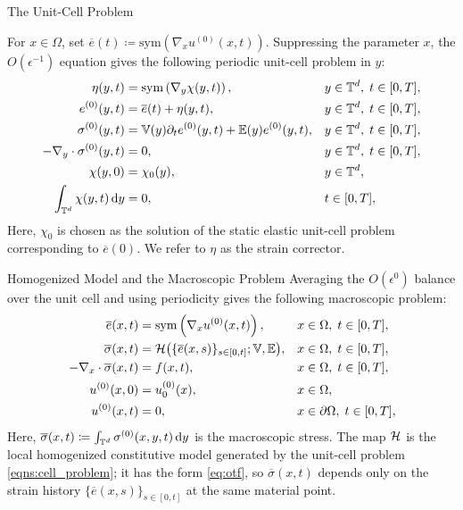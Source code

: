 \documentclass[3p, 12pt, preprint]{elsarticle}
\begin{document}
\begin{namedparagraph}{The Unit-Cell Problem}

For $x\in\Omega$, set $\overline{e}(t)\coloneqq\mathrm{sym}(\nabla_x u^{(0)}(x, t))$. Suppressing the parameter $x$, the $O(\epsilon^{-1})$ equation gives the following periodic unit-cell problem in $y$:
\begin{subequations}\label{eqns:cell_problem}
\begin{align}
    \eta(y,t) & = \mathrm{sym}\left(\nabla_y \chi (y,t)\right), && y \in \mathbb{T}^d,\; t \in [0,T], \label{eq:strain_corrector}\\
    e^{(0)}(y,t) &= \overline{e}(t) + \eta(y,t), && y \in \mathbb{T}^d,\; t \in [0,T], \\
    \sigma^{(0)}(y,t) & = \mathbb{V}(y) \partial_t e^{(0)}(y,t) + \mathbb{E}(y) e^{(0)}(y,t), && y \in \mathbb{T}^d,\; t \in [0,T], \label{eq:cell_stress}\\
    - \nabla_y \cdot \sigma^{(0)}(y,t) &= 0, && y \in \mathbb{T}^d,\; t \in [0,T], \\
    \chi(y,0) & = \chi_{0}(y), && y\in\mathbb{T}^d, \\
    \int_{\mathbb{T}^d} \chi(y,t)\,\mathrm{d} y &= 0, && t\in [0,T],
\end{align}
\end{subequations}
Here, $\chi_0$ is chosen as the solution of the static elastic unit-cell problem corresponding to $\overline{e}(0)$. We refer to $\eta$ as the strain corrector.
\end{namedparagraph}

\begin{namedparagraph}{Homogenized Model and the Macroscopic Problem}
Averaging the $O(\epsilon^{0})$ balance over the unit cell and using periodicity gives the following macroscopic problem:
\begin{subequations}\label{eqns:homogenized_problem}
\begin{align}
    \overline{e}(x,t) &= \mathrm{sym}\left(\nabla_x u^{(0)}(x,t)\right), && x \in \Omega,\; t \in [0,T], \\
    \overline{\sigma}(x,t) &= {\mathcal{H}}\big(\{\overline{e}(x,s)\}_{s\in[0,t]};\mathbb{V},\mathbb{E}\big), && x \in \Omega,\; t \in [0,T], \\
    -\nabla_x \cdot \overline{\sigma}(x,t) &= f(x,t), && x \in \Omega,\; t \in [0,T], \\
    u^{(0)}(x,0) &= u_0^{(0)}(x), && x\in\Omega, \\
    u^{(0)}(x,t) &= 0, && x\in\partial\Omega,\; t\in [0,T],
\end{align}
\end{subequations}
Here, $\overline{\sigma}(x,t) \coloneqq \int_{\mathbb{T}^d} \sigma^{(0)}(x,y,t)\,\mathrm{d}y$ is the macroscopic stress. The map ${\mathcal{H}}$ is the local homogenized constitutive model generated by the unit-cell problem \cref{eqns:cell_problem}; it has the form \eqref{eq:otf}, so $\overline\sigma(x,t)$ depends only on the strain history $\{\overline e(x,s)\}_{s\in[0,t]}$ at the same material point.
\end{namedparagraph}
\end{document}
